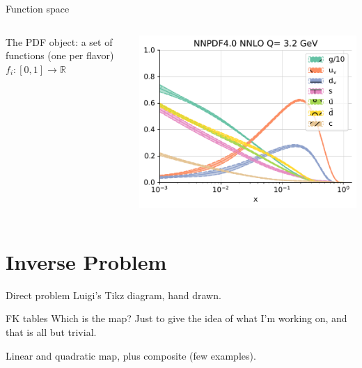 \documentclass[9pt]{beamer}
\begin{document}
\begin{frame}{Function space}
    \begin{columns}
        \begin{column}{0.5\textwidth}
            The PDF object: a set of functions (one per flavor) $f_i: [0, 1] \to \mathbb{R}$
        \end{column}
        \begin{column}{0.5\textwidth}
            \begin{tcolorbox}
                \includegraphics[width=\textwidth]{pdfs_pdg_Qs0_plot_flavours}
            \end{tcolorbox}
        \end{column}
    \end{columns}
\end{frame}

\section{Inverse Problem}

\begin{frame}{Direct problem}
    Luigi's Tikz diagram, hand drawn.
\end{frame}

\begin{frame}{FK tables}
    Which is the map?
    Just to give the idea of what I'm working on, and that is all but trivial.

    Linear and quadratic map, plus composite (few examples).
\end{frame}
\end{document}
